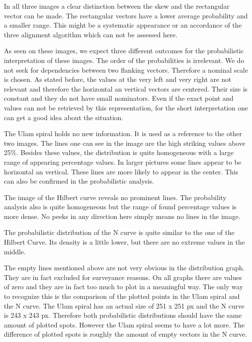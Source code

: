 In all three images a clear distinction between the skew and the rectangular vector can be made. The rectangular vectors have a lower average probability and a smaller range. This might be a systematic appearance or an accordance of the three alignment algorithm which can not be assessed here.

As seen on these images, we expect three different outcomes for the probabilistic interpretation of these images. The order of the probabilities is irrelevant. We do not seek for dependencies between two flanking vectors. Therefore a nominal scale is chosen. As stated before, the values at the very left and very right are not relevant and therefore the horizontal an vertical vectors are centered. Their size is constant and they do not have small nominators. Even if the exact point and values can not be retrieved by this representation, for the short interpretation one can get a good idea about the situation.

The Ulam spiral holds no new information. It is used as a reference to the other two images. The lines one can see in the image are the high striking values above 25\%. Besides these values, the distribution is quite homogeneous with a large range of appearing percentage values. In larger pictures some lines appear to be horizontal an vertical. These lines are more likely to appear in the center. This can also be confirmed in the probabilistic analysis.

The image of the Hilbert curve reveals no prominent lines. The probability analysis also is quite homogeneous but the range of found percentage values is more dense. No peeks in any direction here simply means no lines in the image.

The probabilistic distribution of the N curve is quite similar to the one of the Hilbert Curve. Its density is a little lower, but there are no extreme values in the middle.

The empty lines mentioned above are not very obvious in the distribution graph. They are in fact excluded for surveyance reasons. On all graphs there are values of zero and they are in fact too much to plot in a meaningful way.
The only way to recognize this is the comparison of the plotted points in the Ulam spiral and the N curve. The Ulam spiral has an actual size of 251 x 251 px and the N curve is 243 x 243 px. Therefore both probabilistic distributions should have the same amount of plotted spots. However the Ulam spiral seems to have a lot more. The difference of plotted spots is roughly the amount of empty vectors in the N curve.

